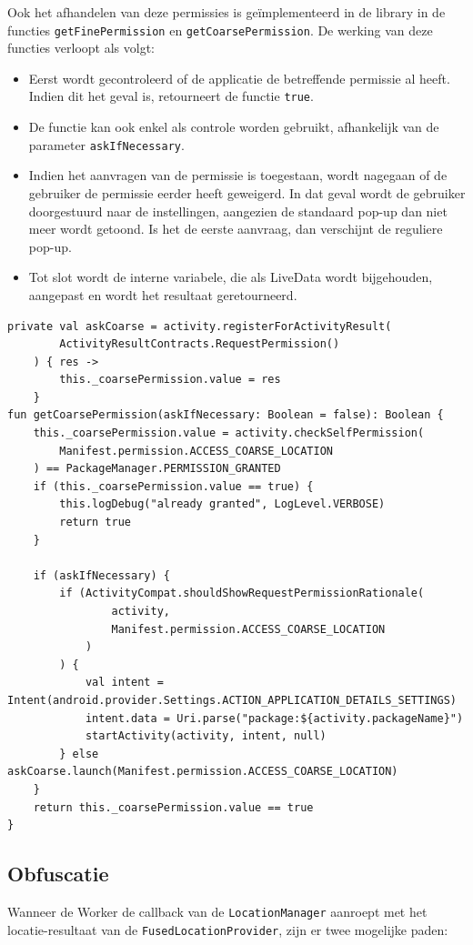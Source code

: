 Ook het afhandelen van deze permissies is geïmplementeerd in de library in de functies \texttt{getFinePermission} en \texttt{getCoarsePermission}.
De werking van deze functies verloopt als volgt:
\begin{itemize}
    \item Eerst wordt gecontroleerd of de applicatie de betreffende permissie al heeft. Indien dit het geval is, retourneert de functie \texttt{true}.
    \item De functie kan ook enkel als controle worden gebruikt, afhankelijk van de parameter \texttt{askIfNecessary}.
    \item Indien het aanvragen van de permissie is toegestaan, wordt nagegaan of de gebruiker de permissie eerder heeft geweigerd. In dat geval wordt de gebruiker doorgestuurd naar de instellingen, aangezien de standaard pop-up dan niet meer wordt getoond. Is het de eerste aanvraag, dan verschijnt de reguliere pop-up.
    \item Tot slot wordt de interne variabele, die als LiveData wordt bijgehouden, aangepast en wordt het resultaat geretourneerd.
\end{itemize}
\begin{verbatim}
private val askCoarse = activity.registerForActivityResult(
        ActivityResultContracts.RequestPermission()
    ) { res ->
        this._coarsePermission.value = res
    }
fun getCoarsePermission(askIfNecessary: Boolean = false): Boolean {
    this._coarsePermission.value = activity.checkSelfPermission(
        Manifest.permission.ACCESS_COARSE_LOCATION
    ) == PackageManager.PERMISSION_GRANTED
    if (this._coarsePermission.value == true) {
        this.logDebug("already granted", LogLevel.VERBOSE)
        return true
    }

    if (askIfNecessary) {
        if (ActivityCompat.shouldShowRequestPermissionRationale(
                activity,
                Manifest.permission.ACCESS_COARSE_LOCATION
            )
        ) {
            val intent = Intent(android.provider.Settings.ACTION_APPLICATION_DETAILS_SETTINGS)
            intent.data = Uri.parse("package:${activity.packageName}")
            startActivity(activity, intent, null)
        } else askCoarse.launch(Manifest.permission.ACCESS_COARSE_LOCATION)
    }
    return this._coarsePermission.value == true
}  
\end{verbatim}

\subsection{Obfuscatie}
Wanneer de Worker de callback van de \texttt{LocationManager} aanroept met het locatie-resultaat van de \texttt{FusedLocationProvider}, zijn er twee mogelijke paden:

